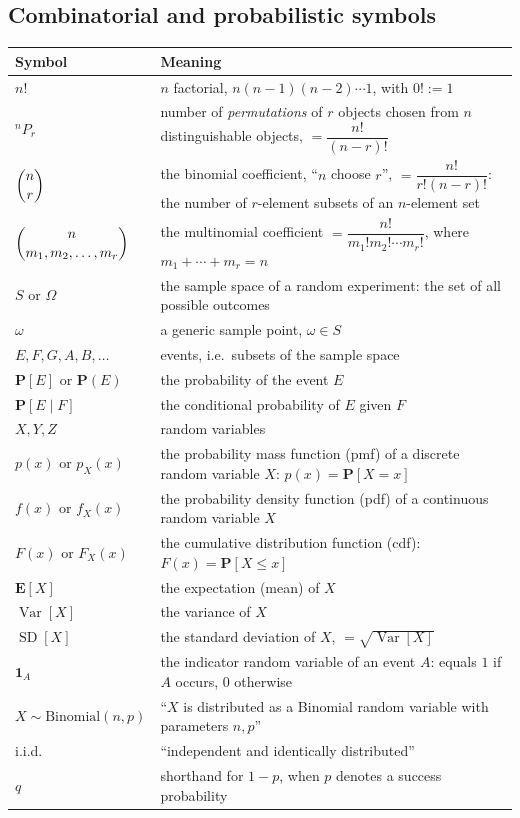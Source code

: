\documentclass[11pt]{article}
\theoremstyle{definition}
\theoremstyle{plain}
\theoremstyle{remark}
\newcommand{\perm}[2]{{}^{#1}P_{#2}}
\begin{document}
\subsection{Combinatorial and probabilistic symbols}

\begin{center}
\renewcommand{\arraystretch}{1.35}
\begin{longtable}{p{3.2cm} p{11cm}}
\toprule
\textbf{Symbol} & \textbf{Meaning} \\
\midrule
$n!$ & $n$ factorial, $n(n-1)(n-2)\cdots 1$, with $0! := 1$ \\
$\perm{n}{r}$ & number of \emph{permutations} of $r$ objects chosen from $n$ distinguishable objects, $= \dfrac{n!}{(n-r)!}$ \\
$\dbinom{n}{r}$ & the binomial coefficient, ``$n$ choose $r$'', $=\dfrac{n!}{r!(n-r)!}$: the number of $r$-element subsets of an $n$-element set \\
$\dbinom{n}{m_1,m_2,\dots,m_r}$ & the multinomial coefficient $=\dfrac{n!}{m_1!m_2!\cdots m_r!}$, where $m_1+\cdots+m_r=n$ \\
$S$ or $\Omega$ & the sample space of a random experiment: the set of all possible outcomes \\
$\omega$ & a generic sample point, $\omega \in S$ \\
$E, F, G, A, B, \dots$ & events, i.e.\ subsets of the sample space \\
$\mathbf{P}[E]$ or $\mathbf{P}(E)$ & the probability of the event $E$ \\
$\mathbf{P}[E \mid F]$ & the conditional probability of $E$ given $F$ \\
$X, Y, Z$ & random variables \\
$p(x)$ or $p_X(x)$ & the probability mass function (pmf) of a discrete random variable $X$: $p(x) = \mathbf{P}[X=x]$ \\
$f(x)$ or $f_X(x)$ & the probability density function (pdf) of a continuous random variable $X$ \\
$F(x)$ or $F_X(x)$ & the cumulative distribution function (cdf): $F(x) = \mathbf{P}[X \le x]$ \\
$\mathbf{E}[X]$ & the expectation (mean) of $X$ \\
$\operatorname{Var}[X]$ & the variance of $X$ \\
$\operatorname{SD}[X]$ & the standard deviation of $X$, $=\sqrt{\operatorname{Var}[X]}$ \\
$\mathbf{1}_A$ & the indicator random variable of an event $A$: equals $1$ if $A$ occurs, $0$ otherwise \\
$X \sim \text{Binomial}(n,p)$ & ``$X$ is distributed as a Binomial random variable with parameters $n,p$'' \\
i.i.d. & ``independent and identically distributed'' \\
$q$ & shorthand for $1-p$, when $p$ denotes a success probability \\
\bottomrule
\end{longtable}
\end{center}
\end{document}
